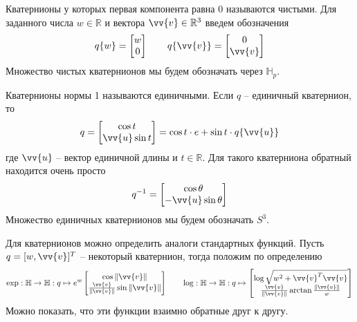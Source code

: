 \documentclass[12pt]{article}
\begin{document}
Кватернионы у которых первая компонента равна 0 называются чистыми. Для заданного
числа $w\in\mathbb{R}$ и вектора $\vv{v}\in\mathbb{R}^3$ введем обозначения
\begin{equation}
    q\{w\}=\begin{bmatrix}
        w \\ 0
    \end{bmatrix}
    \qquad
    q\{\vv{v}\}=\begin{bmatrix}
        0 \\ \vv{v}
    \end{bmatrix}
\end{equation}
Множество чистых кватернионов мы будем обозначать через $\mathbb{H}_p$.

Кватернионы нормы 1 называются единичными. Если $q$ -- единичный кватернион, то
\begin{equation}
    q=\begin{bmatrix}
        \cos t \\ \vv{u} \sin t
    \end{bmatrix}
    =\cos t \cdot e + \sin t \cdot q\{\vv{u}\}
\end{equation}
где $\vv{u}$ -- вектор единичной длины и $t\in\mathbb{R}$. Для такого кватерниона
обратный находится очень просто
\begin{equation}
    q^{-1}=\begin{bmatrix}
        \cos \theta \\ -\vv{u} \sin\theta
    \end{bmatrix}
\end{equation}
Множество единичных кватернионов мы будем обозначать $S^3$.


Для кватернионов можно определить аналоги стандартных функций.
Пусть $q=[w,\vv{v}]^T$ -- некоторый кватернион, тогда положим по определению
\begin{equation}
    \exp:\mathbb{H}\to\mathbb{H}:q\mapsto e^w\begin{bmatrix}
        \cos \Vert \vv{v}\Vert \\
        \frac{\vv{v}}{\Vert\vv{v}\Vert}\sin\Vert\vv{v}\Vert
    \end{bmatrix}
    \qquad
    \log:\mathbb{H}\to\mathbb{H}:q\mapsto \begin{bmatrix}
        \log \sqrt{w^2+\vv{v}^T\vv{v}} \\
        \frac{\vv{v}}{\Vert\vv{v}\Vert}\arctan\frac{\Vert\vv{v}\Vert}{w}
    \end{bmatrix}
\end{equation}
Можно показать, что эти функции взаимно обратные друг к другу.
\end{document}
